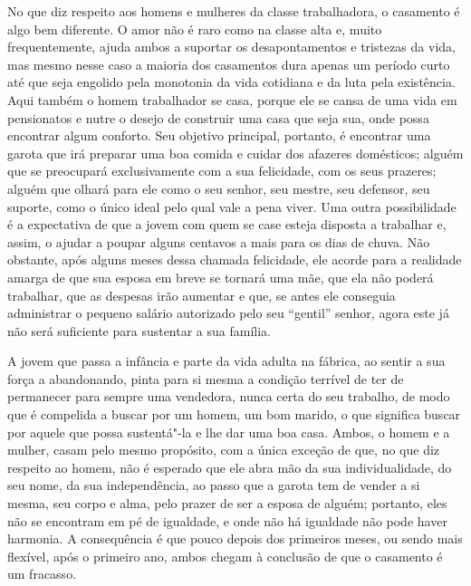 No que diz respeito aos homens e mulheres da classe trabalhadora, o
casamento é algo bem diferente. O amor não é raro como na classe alta e,
muito frequentemente, ajuda ambos a suportar os desapontamentos e
tristezas da vida, mas mesmo nesse caso a maioria dos casamentos dura
apenas um período curto até que seja engolido pela monotonia da vida
cotidiana e da luta pela existência. Aqui também o homem trabalhador se
casa, porque ele se cansa de uma vida em pensionatos e nutre o desejo de
construir uma casa que seja sua, onde possa encontrar algum conforto.
Seu objetivo principal, portanto, é encontrar uma garota que irá
preparar uma boa comida e cuidar dos afazeres domésticos; alguém que se
preocupará exclusivamente com a sua felicidade, com os seus prazeres;
alguém que olhará para ele como o seu senhor, seu mestre, seu defensor,
seu suporte, como o único ideal pelo qual vale a pena viver. Uma outra
possibilidade é a expectativa de que a jovem com quem se case esteja
disposta a trabalhar e, assim, o ajudar a poupar alguns centavos a mais
para os dias de chuva. Não obstante, após alguns meses dessa chamada
felicidade, ele acorde para a realidade amarga de que sua esposa em
breve se tornará uma mãe, que ela não poderá trabalhar, que as despesas
irão aumentar e que, se antes ele conseguia administrar o pequeno salário
autorizado pelo seu ``gentil'' senhor, agora este já não será suficiente
para sustentar a sua família.

A jovem que passa a infância e parte da vida adulta na fábrica, ao
sentir a sua força a abandonando, pinta para si mesma a condição
terrível de ter de permanecer para sempre uma vendedora, nunca certa do
seu trabalho, de modo que é compelida a buscar por um homem, um bom
marido, o que significa buscar por aquele que possa sustentá"-la e lhe
dar uma boa casa. Ambos, o homem e a mulher, casam pelo mesmo propósito,
com a única exceção de que, no que diz respeito ao homem, não é esperado
que ele abra mão da sua individualidade, do seu nome, da sua
independência, ao passo que a garota tem de vender a si mesma, seu corpo
e alma, pelo prazer de ser a esposa de alguém; portanto, eles não se
encontram em pé de igualdade, e onde não há igualdade não pode haver
harmonia. A consequência é que pouco depois dos primeiros meses, ou
sendo mais flexível, após o primeiro ano, ambos chegam à conclusão de
que o casamento é um fracasso.

